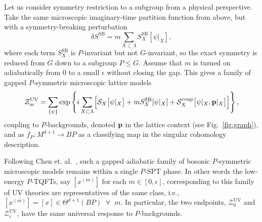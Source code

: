 \documentclass[aps,prx,reprint,superscriptaddress,twocolumn,amsmath,amssymb,amsfonts, nofootinbib]{revtex4-2}
\theoremstyle{apsstyle}
\begin{document}
\medskip 

Let us consider symmetry restriction to a subgroup from a physical perspective.
Take the same microscopic imaginary-time partition function from above, but with a symmetry-breaking perturbation
\begin{equation*}
    \delta S^{\mathrm{SB}}=m\sum_{X\subset \Lambda} S^{\mathrm{SB}}_{X}[\psi\vert_{X}],
\end{equation*}
where each term $S^{\mathrm{SB}}_{X}$ is $P$-invariant but not $G$-invariant, so the exact symmetry is reduced from $G$ down to a subgroup $P\leq G$. Assume that $m$ is turned on adiabatically from $0$ to a small $\epsilon$ without closing the gap. This gives a family of gapped $P$-symmetric microscopic lattice models
\begin{equation*}
    \mathcal{Z}^{\mathrm{UV}}_{m}=\sum_{\{\psi\}} \exp\left\{
      i \sum_{X \subset \Lambda}
      \Bigl[\mathcal S_{X}\bigl[\psi\vert_{X}\bigr]
      + m S^{\mathrm{SB}}_{X}[\psi\vert_{X}] + \mathcal{S}_{X}^{\mathrm{coup}}\bigl[\psi\vert_{X}, {\bf p}\vert_{X}\bigr] \Bigr]
    \right\},
\end{equation*}
coupling to $P$-backgrounds, denoted ${\bf p}$ in the lattice context (see Fig.~\ref{fig:graph}), and as $f_{P}: M^{d+1}\to BP$ as a classifying map in the singular cohomology description. 

\medskip 

Following Chen et. al.~\cite{Chen2013}, such a gapped adiabatic family of bosonic $P$-symmetric microscopic models remains within a single $P$-SPT phase. In other words the low-energy $P$-TQFTs, say $[x^{(m)}]$ for each $m\in [0, \epsilon]$, corresponding to this family of UV theories are representatives of the same class, i.e., $[x^{(m)}]=[x]\in \Theta^{d+1}(BP)\;\;\forall \;\; m$.  
In particular, the two endpoints, $\mathcal{Z}^{\mathrm{UV}}_{0}$ and $\mathcal{Z}^{\mathrm{UV}}_{\epsilon}$, have the same universal response to $P$-backgrounds.

\bigskip 
\end{document}
